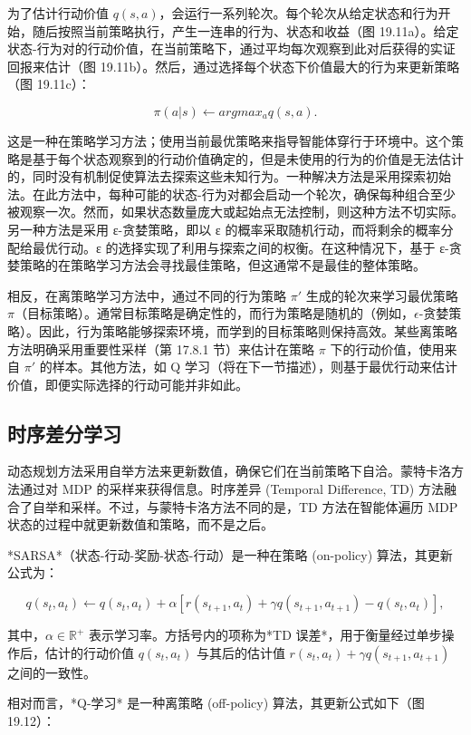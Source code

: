 为了估计行动价值 \(q(s, a)\)，会运行一系列轮次。每个轮次从给定状态和行为开始，随后按照当前策略执行，产生一连串的行为、状态和收益（图 19.11a）。给定状态-行为对的行动价值，在当前策略下，通过平均每次观察到此对后获得的实证回报来估计（图 19.11b）。然后，通过选择每个状态下价值最大的行为来更新策略（图 19.11c）：

\[
\pi(a|s) \leftarrow argmax_a q(s, a). \tag{19.13}
\]

这是一种在策略学习方法；使用当前最优策略来指导智能体穿行于环境中。这个策略是基于每个状态观察到的行动价值确定的，但是未使用的行为的价值是无法估计的，同时没有机制促使算法去探索这些未知行为。一种解决方法是采用探索初始法。在此方法中，每种可能的状态-行为对都会启动一个轮次，确保每种组合至少被观察一次。然而，如果状态数量庞大或起始点无法控制，则这种方法不切实际。另一种方法是采用 ε-贪婪策略，即以 ε 的概率采取随机行动，而将剩余的概率分配给最优行动。ε 的选择实现了利用与探索之间的权衡。在这种情况下，基于 ε-贪婪策略的在策略学习方法会寻找最佳策略，但这通常不是最佳的整体策略。

相反，在离策略学习方法中，通过不同的行为策略 \(\pi \prime\) 生成的轮次来学习最优策略 \(\pi\)（目标策略）。通常目标策略是确定性的，而行为策略是随机的（例如，\(\epsilon\)-贪婪策略）。因此，行为策略能够探索环境，而学到的目标策略则保持高效。某些离策略方法明确采用重要性采样（第 17.8.1 节）来估计在策略 \(\pi\) 下的行动价值，使用来自 \(\pi \prime\) 的样本。其他方法，如 Q 学习（将在下一节描述），则基于最优行动来估计价值，即便实际选择的行动可能并非如此。

\subsection{时序差分学习}
动态规划方法采用自举方法来更新数值，确保它们在当前策略下自洽。蒙特卡洛方法通过对 MDP 的采样来获得信息。时序差异 (Temporal Difference, TD) 方法融合了自举和采样。不过，与蒙特卡洛方法不同的是，TD 方法在智能体遍历 MDP 状态的过程中就更新数值和策略，而不是之后。

*SARSA*（状态-行动-奖励-状态-行动）是一种在策略 (on-policy) 算法，其更新公式为：

\[
q(s_t, a_t) \leftarrow q(s_t, a_t) + \alpha \left[ r(s_{t+1}, a_t) + \gamma q(s_{t+1}, a_{t+1}) - q(s_t, a_t) \right], \tag{19.14}
\]

其中，\(\alpha \in \mathbb{R}^+\) 表示学习率。方括号内的项称为*TD 误差*，用于衡量经过单步操作后，估计的行动价值 \(q(s_t, a_t)\) 与其后的估计值 \(r(s_t, a_t)+\gamma q(s_{t+1}, a_{t+1})\) 之间的一致性。

相对而言，*Q-学习* 是一种离策略 (off-policy) 算法，其更新公式如下（图 19.12）：

